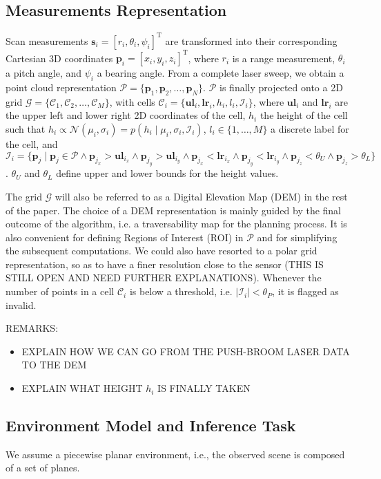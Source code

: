 \subsection{Measurements Representation}
Scan measurements $\mathbf{s}_i=[r_i,\theta_i,\psi_i]^\text{T}$ are transformed
into their corresponding Cartesian 3D coordinates $\mathbf{p}_i=[x_i,y_i,z_i]
^\text{T}$, where $r_i$ is a range measurement, $\theta_i$ a pitch angle, and
$\psi_i$ a bearing angle. From a complete laser sweep, we obtain a point cloud
representation $\mathcal{P}=\{\mathbf{p}_1,\mathbf{p}_2,\dots,\mathbf{p}_N\}$.
$\mathcal{P}$ is finally projected onto a 2D grid $\mathcal{G}=\{\mathcal{C}_1,
\mathcal{C}_2,\dots,\mathcal{C}_M\}$, with cells $\mathcal{C}_i=
\{\mathbf{ul}_i,\mathbf{lr}_i,h_i,l_i,\mathcal{I}_i\}$, where $\mathbf{ul}_i$
and $\mathbf{lr}_i$ are the upper left and lower right 2D coordinates of the
cell, $h_i$ the height of the cell such that $h_i\propto\mathcal{N}(\mu_i,
\sigma_i)=p(h_i\mid\mu_i,\sigma_i,\mathcal{I}_i)$, $l_i\in\{1,\dots,M\}$ a
discrete label for the cell, and $\mathcal{I}_i=\{\mathbf{p}_j\mid\mathbf{p}_j
\in\mathcal{P}\wedge\mathbf{p}_{j_x}>\mathbf{ul}_{i_x}\wedge\mathbf{p}_{j_y}>
\mathbf{ul}_{i_y}\wedge\mathbf{p}_{j_x}<\mathbf{lr}_{i_x}\wedge\mathbf{p}_{j_y}
<\mathbf{lr}_{i_y}\wedge\mathbf{p}_{j_z}<\theta_U\wedge\mathbf{p}_{j_z}>
\theta_L\}$. $\theta_U$ and $\theta_L$ define upper and lower bounds for the
height values.

The grid $\mathcal{G}$ will also be referred to as a Digital Elevation Map (DEM)
in the rest of the paper. The choice of a DEM representation is mainly guided by
the final outcome of the algorithm, i.e. a traversability map for the planning
process. It is also convenient for defining Regions of Interest (ROI) in
$\mathcal{P}$ and for simplifying the subsequent computations. We could also
have resorted to a polar grid representation, so as to have a finer resolution
close to the sensor (THIS IS STILL OPEN AND NEED FURTHER EXPLANATIONS). Whenever
the number of points in a cell $\mathcal{C}_i$ is below a threshold, i.e.
$|\mathcal{I}_i|<\theta_P$, it is flagged as invalid.

REMARKS:
\begin{itemize}
\item EXPLAIN HOW WE CAN GO FROM THE PUSH-BROOM LASER DATA TO THE DEM
\item EXPLAIN WHAT HEIGHT $h_i$ IS FINALLY TAKEN
\end{itemize}

\subsection{Environment Model and Inference Task}
We assume a piecewise planar environment, i.e., the observed scene is composed
of a set of planes.
